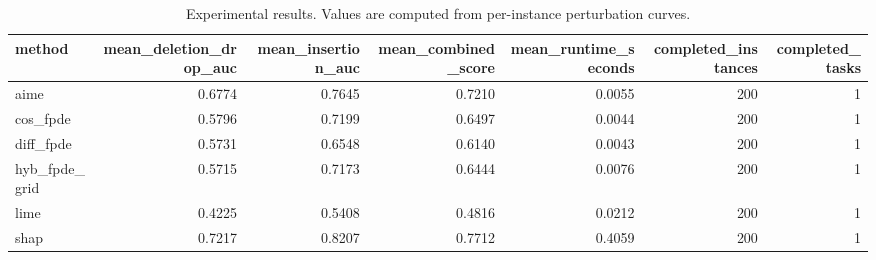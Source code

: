 \begin{table}[t]
\caption{Experimental results. Values are computed from per-instance perturbation curves.}
\label{tab:main_results_computed}
\centering
\begin{tabular}{lrrrrrr}
\toprule
method & mean\_deletion\_drop\_auc & mean\_insertion\_auc & mean\_combined\_score & mean\_runtime\_seconds & completed\_instances & completed\_tasks \\
\midrule
aime & 0.6774 & 0.7645 & 0.7210 & 0.0055 & 200 & 1 \\
cos\_fpde & 0.5796 & 0.7199 & 0.6497 & 0.0044 & 200 & 1 \\
diff\_fpde & 0.5731 & 0.6548 & 0.6140 & 0.0043 & 200 & 1 \\
hyb\_fpde\_grid & 0.5715 & 0.7173 & 0.6444 & 0.0076 & 200 & 1 \\
lime & 0.4225 & 0.5408 & 0.4816 & 0.0212 & 200 & 1 \\
shap & 0.7217 & 0.8207 & 0.7712 & 0.4059 & 200 & 1 \\
\bottomrule
\end{tabular}

\end{table}
